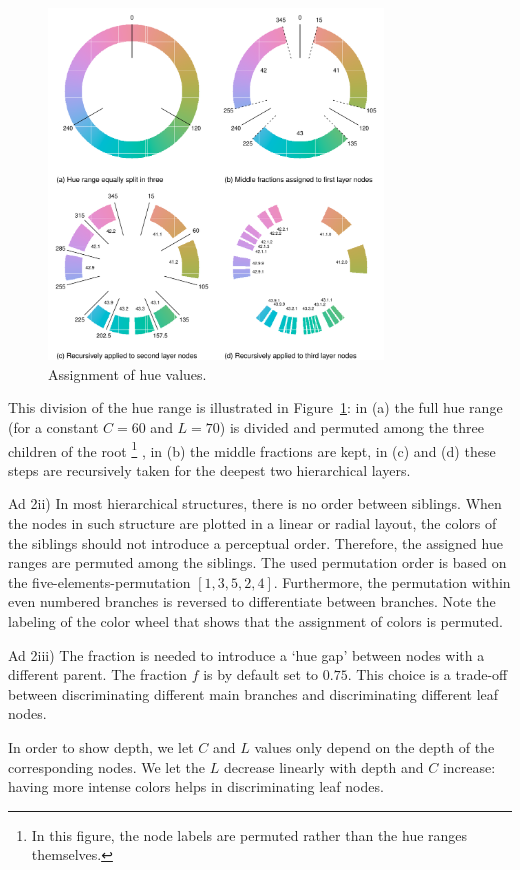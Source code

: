 \documentclass[review]{vgtc}                 %
\begin{document}
\begin{figure}[htb]
  \centering
  \includegraphics[width=3.5in]{hcl_method.pdf}
  \caption{Assignment of hue values.}\label{fig:wheel}
\end{figure}

This division of the hue range is illustrated in Figure~\ref{fig:wheel}: in (a) the full hue range (for a constant $C=60$ and $L=70$)  is divided and permuted among the three children of the root
\footnote{In this figure, the node labels are permuted rather than the hue ranges themselves.} , in (b) the middle fractions are kept, in (c) and (d) these steps are recursively taken for the deepest two hierarchical layers.

Ad 2ii) In most hierarchical structures, there is no order between siblings. When the nodes in such structure are plotted in a linear or radial layout, the colors of the siblings should not introduce a perceptual order. Therefore, the assigned hue ranges are permuted among the siblings. The used permutation order is based on the five-elements-permutation $[1, 3, 5, 2, 4]$. Furthermore, the permutation within even numbered branches is reversed to differentiate between branches. Note the labeling of the color wheel that shows that the assignment of colors is permuted.

Ad 2iii) The fraction is needed to introduce a `hue gap' between nodes with a different parent. The fraction $f$ is by default set to $0.75$. This choice is a trade-off between discriminating different main branches and discriminating different leaf nodes. 

In order to show depth, we let $C$ and $L$ values only depend on the depth of the corresponding nodes. We let the $L$ decrease linearly with depth and $C$ increase: having more intense colors helps in discriminating leaf nodes.
\end{document}
